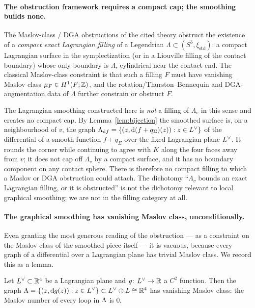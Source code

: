\paragraph{The obstruction framework requires a compact cap; the smoothing builds
none.} The Maslov-class / DGA obstructions of the cited theory obstruct the
existence of a \emph{compact exact Lagrangian filling} of a Legendrian
$\Lambda\subset(S^3,\xi_{\mathrm{std}})$: a compact Lagrangian surface in the
symplectization (or in a Liouville filling of the contact boundary) whose only
boundary is $\Lambda$, cylindrical near the contact end. The classical Maslov-class
constraint is that such a filling $F$ must have vanishing Maslov class
$\mu_F\in H^1(F;\mathbb{Z})$, and the rotation/Thurston--Bennequin and DGA-augmentation
data of $\Lambda$ further constrain or obstruct $F$.

The Lagrangian smoothing constructed here is \emph{not} a filling of $\Lambda_v$
in this sense and creates no compact cap. By Lemma~\ref{lem:bijection} the
smoothed surface is, on a neighbourhood of $v$, the graph
$\Lambda_{\mathrm d f}=\{(z,\mathrm d(f+q_\Sigma)(z)):z\in L^{\vee}\}$ of the differential of a
smooth function $f+q_\Sigma$ over the fixed Lagrangian plane $L^{\vee}$. It rounds
the corner while continuing to agree with $K$ along the four faces away from $v$;
it does not cap off $\Lambda_v$ by a compact surface, and it has no boundary
component on any contact sphere. There is therefore no compact filling to which a
Maslov or DGA obstruction could attach. The dichotomy ``$\Lambda_v$ bounds an
exact Lagrangian filling, or it is obstructed'' is not the dichotomy relevant to
local graphical smoothing; we are not in the filling category at all.

\paragraph{The graphical smoothing has vanishing Maslov class, unconditionally.}
Even granting the most generous reading of the obstruction --- as a constraint on
the Maslov class of the smoothed piece itself --- it is vacuous, because every
graph of a differential over a Lagrangian plane has trivial Maslov class. We
record this as a lemma.

\begin{qeightlemma}\label{lem:maslov-zero}
Let $L^{\vee}\subset\mathbb{R}^4$ be a Lagrangian plane and $g\colon L^{\vee}\to\mathbb{R}$ a
$C^2$ function. Then the graph
$\Lambda=\{(z,\mathrm d g(z)):z\in L^{\vee}\}\subset L^{\vee}\oplus L\cong\mathbb{R}^4$ has
vanishing Maslov class: the Maslov number of every loop in $\Lambda$ is $0$.
\end{qeightlemma}

